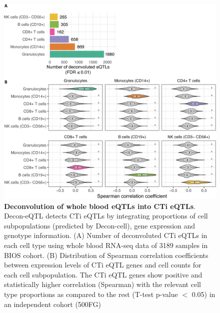 \begin{figure}[H]
	\includegraphics[width=\textwidth]{chapters/chapter4-deconvolution/img/fig3.png}
	\caption{\textbf{Deconvolution of whole blood eQTLs into CTi eQTLs}. Decon-eQTL detects CTi eQTLs by integrating proportions of cell subpopulations (predicted by Decon-cell), gene expression and genotype information. (A) Number of deconvoluted CTi eQTLs in each cell type using whole blood RNA-seq data of 3189 samples in BIOS cohort. (B) Distribution of Spearman correlation coefficients between expression levels of CTi eQTL genes and cell counts for each cell subpopulation. The CTi eQTL genes show positive and statistically higher correlation (Spearman) with the relevant cell type proportions as compared to the rest (T-test p-value $<$ 0.05) in an independent cohort (500FG)}
	\label{decon_fig3}
\end{figure}


